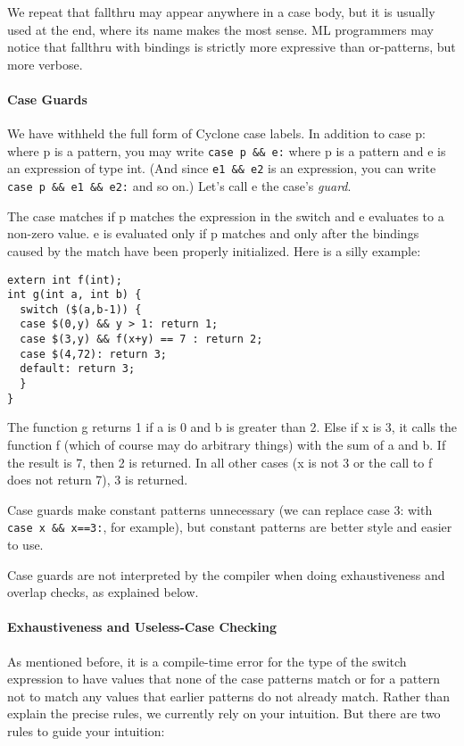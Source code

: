 We repeat that fallthru may appear anywhere in a case body, but it is
usually used at the end, where its name makes the most sense.  ML
programmers may notice that fallthru with bindings is strictly more
expressive than or-patterns, but more verbose.

\paragraph{Case Guards}

We have withheld the full form of Cyclone case labels.  In addition to
case p: where p is a pattern, you may write \texttt{case p \&\& e:} where
p is a pattern and e is an expression of type int.  (And since
\texttt{e1 \&\& e2} is an expression, you can write
\texttt{case p \&\& e1 \&\& e2:} and so on.)  Let's call e the case's
\textit{guard}.


The case matches if p matches the expression in the switch and e
evaluates to a non-zero value.  e is evaluated only if p matches and
only after the bindings caused by the match have been properly
initialized.  Here is a silly example:

\begin{verbatim}
extern int f(int);
int g(int a, int b) {
  switch ($(a,b-1)) {
  case $(0,y) && y > 1: return 1;
  case $(3,y) && f(x+y) == 7 : return 2;
  case $(4,72): return 3;
  default: return 3;
  }
}
\end{verbatim}


The function g returns 1 if a is 0 and b is greater than 2.  Else if x
is 3, it calls the function f (which of course may do arbitrary
things) with the sum of a and b.  If the result is 7, then 2 is
returned.  In all other cases (x is not 3 or the call to f does not
return 7), 3 is returned.


Case guards make constant patterns unnecessary (we can replace case 3:
with \texttt{case x \&\& x==3:}, for example), but constant patterns are
better style and easier to use.


Case guards are not interpreted by the compiler when doing
exhaustiveness and overlap checks, as explained below.


\paragraph{Exhaustiveness and Useless-Case Checking}

As mentioned before, it is a compile-time error for the type of the
switch expression to have values that none of the case patterns match
or for a pattern not to match any values that earlier patterns do not
already match.  Rather than explain the precise rules, we currently
rely on your intuition.  But there are two rules to guide your
intuition:

